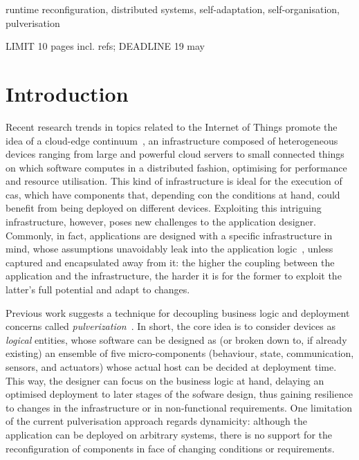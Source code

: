 \documentclass[conference]{IEEEtran}
\newcommand{\meta}[1]{{\color{blue}#1}}
\begin{document}
\begin{IEEEkeywords}
runtime reconfiguration, distributed systems, self-adaptation, self-organisation, pulverisation
\end{IEEEkeywords}

\newcommand{\ourframework}{\texttt{pulse-refrakt}}

\meta{LIMIT 10 pages incl. refs; DEADLINE 19 may}

\section{Introduction}\label{sec:introduction}

Recent research trends in topics related to the Internet of Things promote the idea of a cloud-edge continuum~\cite{DBLP:journals/iot/BittencourtISFM18},
an infrastructure composed of heterogeneous devices ranging from large and powerful cloud servers to small connected things
on which software computes in a distributed fashion,
optimising for performance and resource utilisation.
%
This kind of infrastructure is ideal for the execution of \ac{cas},
which have components that,
depending con the conditions at hand,
could benefit from being deployed on different devices.
%
Exploiting this intriguing infrastructure, however, poses new challenges to the application designer.
%
Commonly, in fact, applications are designed with a specific infrastructure in mind,
whose assumptions unavoidably leak into the application logic~\cite{Spolsky2004},
unless captured and encapsulated away from it:
the higher the coupling between the application and the infrastructure,
the harder it is for the former to exploit the latter's full potential and adapt to changes.

Previous work suggests a technique for decoupling business logic and deployment concerns
called \emph{pulverization}~\cite{FI2020-pulverization}.
%
In short, the core idea is to consider devices as \emph{logical} entities,
whose software can be designed as (or broken down to, if already existing) an ensemble of five micro-components
(behaviour, state, communication, sensors, and actuators)
whose actual host can be decided at deployment time.
%
This way, the designer can focus on the business logic at hand,
delaying an optimised deployment to later stages of the sofware design,
thus gaining resilience to changes in the infrastructure or in non-functional requirements.
%
One limitation of the current pulverisation approach regards dynamicity:
although the application can be deployed on arbitrary systems,
there is no support for the reconfiguration of components in face of changing conditions or requirements.
\end{document}

